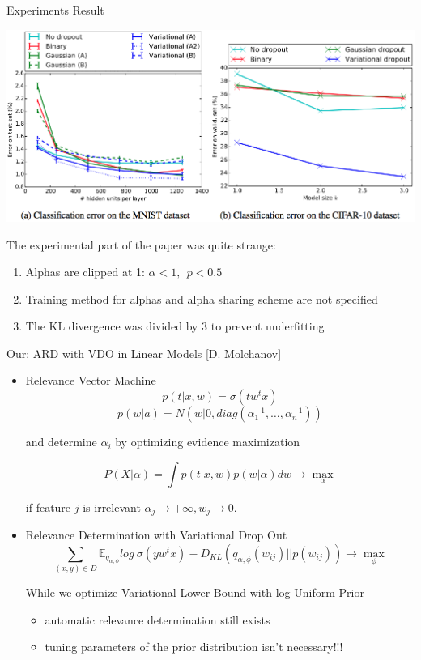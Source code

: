\documentclass{beamer}
\begin{document}
\begin{frame}{Experiments Result}
	\begin{center}
		\includegraphics[scale=0.3]{./img/weling.png}
	\end{center}
	The experimental part of the paper was quite strange:
	\begin{enumerate}
		\item Alphas are clipped at 1: $\alpha < 1,~~p < 0.5$
		\item Training method for alphas and alpha sharing scheme are not
		specified
		\item The KL divergence was divided by 3 to prevent underfitting
	\end{enumerate}
\end{frame}

\begin{frame}{Our: ARD with VDO in Linear Models {\scriptsize[D. Molchanov]}}
	\begin{itemize}
		\item Relevance Vector Machine
		$$p(t|x, w) = \sigma(tw^tx)$$
		$$p(w|a) = N(w|0, diag(\alpha_1^{-1}, \dots, \alpha_n^{-1}))$$
		
		and determine $\alpha_i$ by optimizing evidence maximization
		
		$$P(X|\alpha) = \int p(t| x, w) p(w|\alpha) dw \rightarrow \max_{\alpha}$$
		
		if feature $j$ is irrelevant $\alpha_j \rightarrow +\infty, w_j \rightarrow 0$.
		\item Relevance Determination with Variational Drop Out
		$$\sum_{(x, y) \in D}\mathds{E}_{q_{\alpha, \phi}} log~\sigma(yw^tx) - D_{KL}(q_{\alpha, \phi}(w_{ij}) || p(w_{ij})) \rightarrow \max_{\phi}$$
		
		While we optimize Variational Lower Bound with log-Uniform Prior
		\begin{itemize}
			\item automatic relevance determination still exists
			\item tuning parameters of the prior distribution isn't necessary!!!
		\end{itemize}
	\end{itemize}
\end{frame}
\end{document}
